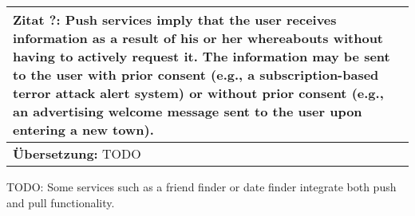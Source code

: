 \begin{table}[h]
	\centering
	\begin{tabular}{|p{16cm}|}\hline
		\textbf{Zitat ?:} \glqq Push services imply that the user receives information as a result of his or her whereabouts without having to actively request it. The information may be sent to the user with prior consent (e.g., a subscription-based terror attack alert system) or without prior consent (e.g., an advertising welcome message sent to the user upon entering a new town). \cite[S.20]{Schiller2004} \\ \hline
		\textbf{Übersetzung:} TODO \\ \hline
	\end{tabular}
\end{table}


TODO: Some services such as a friend finder or date finder integrate both push and pull functionality.